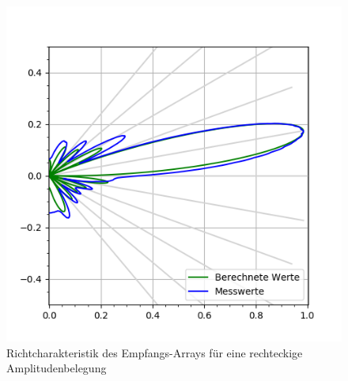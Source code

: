 \clearpage
\begin{figure}[htb]
\begin{minipage}{0.5\textwidth}
\includegraphics[width=\textwidth]{graphics/plot_test_characteristic_receiver_10_deg_send_rect_receive_rect_4_bursts.png}
\caption{Richtcharakteristik des Empfangs-Arrays für eine rechteckige Amplitudenbelegung} %
\label{fig:plot_test_characteristic_receiver_10_deg_send_rect_receive_rect_4_bursts}
%
\end{minipage}
\begin{minipage}{0.5\textwidth}

\end{minipage}
\end{figure}
